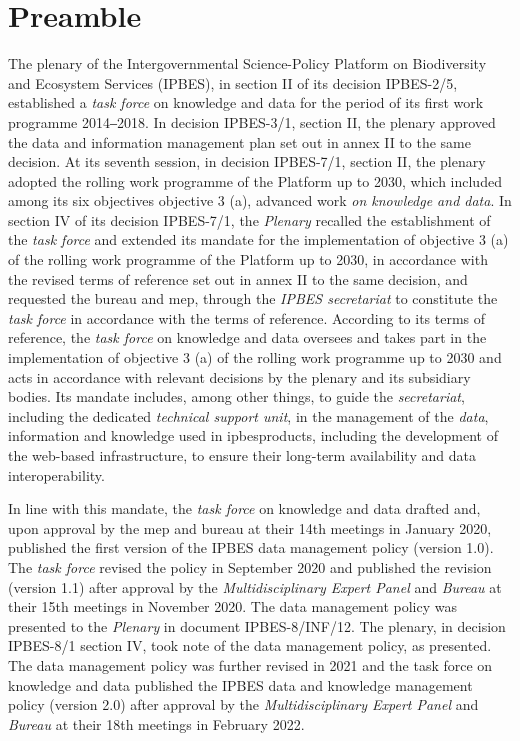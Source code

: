 \documentclass{article}
\begin{document}
\newpage

\tableofcontents
\newpage

\section{Preamble}

The \gls{plenary} of the Intergovernmental Science-Policy Platform on Biodiversity and Ecosystem Services (IPBES), in section II of its decision IPBES-2/5, established a \textit{task force} on knowledge and data for the period of its first work programme 2014‒2018. In decision IPBES-3/1, section II, the \gls{plenary} approved the data and information management plan set out in annex II to the same decision. At its seventh session, in decision IPBES-7/1, section II, the \gls{plenary} adopted the rolling work programme of the Platform up to 2030, which included among its six objectives objective 3 (a), advanced work \textit{on knowledge and data}. In section IV of its decision IPBES-7/1, the \textit{Plenary }recalled the establishment of the \textit{task force} and extended its mandate for the implementation of objective 3 (a) of the rolling work programme of the Platform up to 2030, in accordance with the revised terms of reference set out in annex II to the same decision, and requested the \gls{bureau} and \gls{mep}, through the \textit{IPBES secretariat} to constitute the \textit{task force} in accordance with the terms of reference. According to its terms of reference, the \textit{task force} on knowledge and data oversees and takes part in the implementation of objective 3 (a) of the rolling work programme up to 2030 and acts in accordance with relevant decisions by the \gls{plenary} and its subsidiary bodies. Its mandate includes, among other things, to guide the \textit{secretariat}, including the dedicated \textit{technical support unit}, in the management of the \textit{data}, information and knowledge used in \gls{ipbesproducts}, including the development of the web-based infrastructure, to ensure their long-term availability and data interoperability.

In line with this mandate, the \textit{task force} on knowledge and data drafted and, upon approval by the \gls{mep} and \gls{bureau} at their 14th meetings in January 2020, published the first version of the IPBES data management policy (version 1.0). The \textit{task force }revised the policy in September 2020 and published the revision (version 1.1) after approval by the \textit{Multidisciplinary Expert Panel }and \textit{Bureau } at their 15th meetings in November 2020. The data management policy was presented to the \textit{Plenary }in document IPBES-8/INF/12. The \gls{plenary}, in decision IPBES-8/1 section IV, took note of the data management policy, as presented. The data management policy was further revised in 2021 and the task force on knowledge and data published the IPBES data and knowledge management policy (version 2.0) after approval by the \textit{Multidisciplinary Expert Panel }and \textit{Bureau }at their 18th meetings in February 2022.
\end{document}
